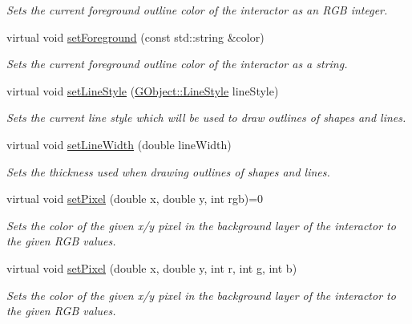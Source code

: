 \begin{DoxyCompactItemize}
\begin{DoxyCompactList}\small\item\em Sets the current foreground outline color of the interactor as an R\+GB integer. \end{DoxyCompactList}\item 
virtual void \mbox{\hyperlink{classGDrawingSurface_af59209aeadea6dfc6d97a2d8531f50e1}{set\+Foreground}} (const std\+::string \&color)
\begin{DoxyCompactList}\small\item\em Sets the current foreground outline color of the interactor as a string. \end{DoxyCompactList}\item 
virtual void \mbox{\hyperlink{classGDrawingSurface_a6bfe14a77101db0fb97b5a7e07a5526b}{set\+Line\+Style}} (\mbox{\hyperlink{classGObject_a86e0f5648542856159bb40775c854aa7}{G\+Object\+::\+Line\+Style}} line\+Style)
\begin{DoxyCompactList}\small\item\em Sets the current line style which will be used to draw outlines of shapes and lines. \end{DoxyCompactList}\item 
virtual void \mbox{\hyperlink{classGDrawingSurface_afd6a47c6ea6a1f85ca05a65ba3ff3477}{set\+Line\+Width}} (double line\+Width)
\begin{DoxyCompactList}\small\item\em Sets the thickness used when drawing outlines of shapes and lines. \end{DoxyCompactList}\item 
virtual void \mbox{\hyperlink{classGDrawingSurface_ac9f0a75ccb0abe1123046bab56479b84}{set\+Pixel}} (double x, double y, int rgb)=0
\begin{DoxyCompactList}\small\item\em Sets the color of the given x/y pixel in the background layer of the interactor to the given R\+GB values. \end{DoxyCompactList}\item 
virtual void \mbox{\hyperlink{classGDrawingSurface_aec90e927c9da286214908d3f9da685d7}{set\+Pixel}} (double x, double y, int r, int g, int b)
\begin{DoxyCompactList}\small\item\em Sets the color of the given x/y pixel in the background layer of the interactor to the given R\+GB values. \end{DoxyCompactList}\item 

\end{DoxyCompactItemize}
